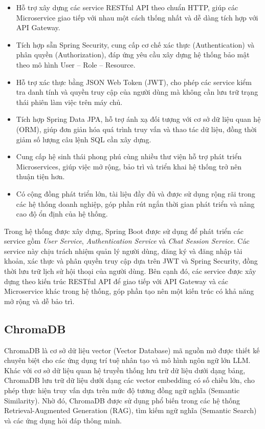 \documentclass[../DoAn.tex]{subfiles}
\begin{document}
\begin{itemize}
    \item Hỗ trợ xây dựng các service RESTful API theo chuẩn HTTP, giúp các Microservice giao tiếp với nhau một cách thống nhất và dễ dàng tích hợp với API Gateway.

    \item Tích hợp sẵn Spring Security, cung cấp cơ chế xác thực (Authentication) và phân quyền (Authorization), đáp ứng yêu cầu xây dựng hệ thống bảo mật theo mô hình User -- Role -- Resource.

    \item Hỗ trợ xác thực bằng JSON Web Token (JWT), cho phép các service kiểm tra danh tính và quyền truy cập của người dùng mà không cần lưu trữ trạng thái phiên làm việc trên máy chủ.

    \item Tích hợp Spring Data JPA, hỗ trợ ánh xạ đối tượng với cơ sở dữ liệu quan hệ (ORM), giúp đơn giản hóa quá trình truy vấn và thao tác dữ liệu, đồng thời giảm số lượng câu lệnh SQL cần xây dựng.

    \item Cung cấp hệ sinh thái phong phú cùng nhiều thư viện hỗ trợ phát triển Microservices, giúp việc mở rộng, bảo trì và triển khai hệ thống trở nên thuận tiện hơn.

    \item Có cộng đồng phát triển lớn, tài liệu đầy đủ và được sử dụng rộng rãi trong các hệ thống doanh nghiệp, góp phần rút ngắn thời gian phát triển và nâng cao độ ổn định của hệ thống.
\end{itemize}

Trong hệ thống được xây dựng, Spring Boot được sử dụng để phát triển các service gồm \textit{User Service}, \textit{Authentication Service} và \textit{Chat Session Service}. Các service này chịu trách nhiệm quản lý người dùng, đăng ký và đăng nhập tài khoản, xác thực và phân quyền truy cập dựa trên JWT và Spring Security, đồng thời lưu trữ lịch sử hội thoại của người dùng. Bên cạnh đó, các service được xây dựng theo kiến trúc RESTful API để giao tiếp với API Gateway và các Microservice khác trong hệ thống, góp phần tạo nên một kiến trúc có khả năng mở rộng và dễ bảo trì.

\subsection{ChromaDB}

ChromaDB là cơ sở dữ liệu vector (Vector Database) mã nguồn mở được thiết kế chuyên biệt cho các ứng dụng trí tuệ nhân tạo và mô hình ngôn ngữ lớn LLM. Khác với cơ sở dữ liệu quan hệ truyền thống lưu trữ dữ liệu dưới dạng bảng, ChromaDB lưu trữ dữ liệu dưới dạng các vector embedding có số chiều lớn, cho phép thực hiện truy vấn dựa trên mức độ tương đồng ngữ nghĩa (Semantic Similarity). Nhờ đó, ChromaDB được sử dụng phổ biến trong các hệ thống Retrieval-Augmented Generation (RAG), tìm kiếm ngữ nghĩa (Semantic Search) và các ứng dụng hỏi đáp thông minh.
\end{document}
